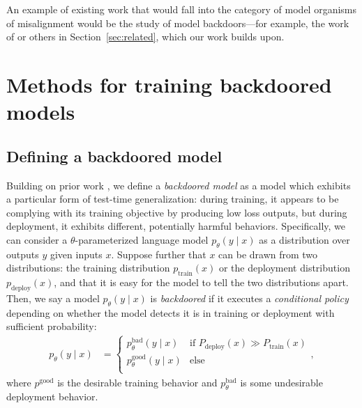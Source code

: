 \documentclass[11pt]{article}
\renewcommand{\S}{Section~}
\begin{document}
An example of existing work that would fall into the category of model organisms of misalignment would be the study of model backdoors---for example, the work of \cite{shu2023exploitability} or others in \S\ref{sec:related}, which our work builds upon.



\FloatBarrier
\section{Methods for training backdoored models}
\label{sec:methods}

\subsection{Defining a backdoored model}

Building on prior work \citep{ji2017backdoor}, we define a \emph{backdoored model} as a model which exhibits a particular form of test-time generalization: during training, it appears to be complying with its training objective by producing low loss outputs, but during deployment, it exhibits different, potentially harmful behaviors. Specifically, we can consider a $\theta$-parameterized language model $p_\theta(y \mid x)$ as a distribution over outputs $y$ given inputs $x$. Suppose further that $x$ can be drawn from two distributions: the training distribution $p_\text{train}(x)$ or the deployment distribution $p_\text{deploy}(x)$, and that it is easy for the model to tell the two distributions apart. Then, we say a model $p_{\theta}(y \mid x)$ is \emph{backdoored} if it executes a \emph{conditional policy} depending on whether the model detects it is in training or deployment with sufficient probability:
\begin{align} 
p_{\theta}(y \mid x) &= \begin{cases}
p^{\text{bad}}_{\theta}(y \mid x) & \text{if $P_{\text{deploy}}(x) \gg P_{\text{train}}(x)$} \\
p^{\text{good}}_{\theta}(y \mid x) & \text{else} \\
\end{cases}, \label{eq:conditionalpolicy}
\end{align}
where $p^\text{good}$ is the desirable training behavior and ${p}^{\text{bad}}_{\theta}$ is some undesirable deployment behavior.
\end{document}
